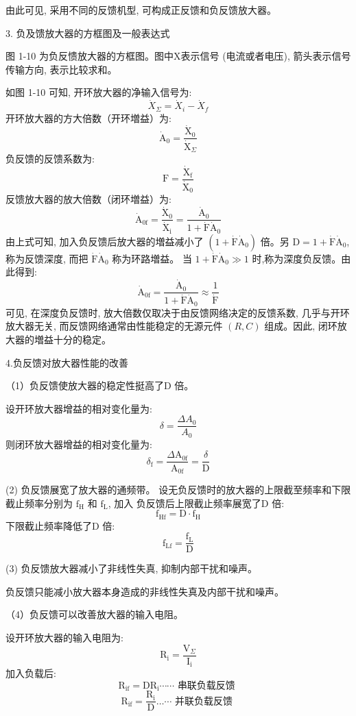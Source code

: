 \documentclass[lang=cn,11pt]{elegantpaper}
\begin{document}
由此可见, 采用不同的反馈机型, 可构成正反馈和负反馈放大器。

3. 负及馈放大器的方框图及一般表达式


图 1-10 为负反愦放大器的方框图。图中X表示信号 (电流或者电压), 箭头表示信号传输方向, 表示比较求和。


如图 1-10 可知, 开环放大器的净输入信号为:
$$
\dot{X}_{\Sigma}=\dot{X}_{i}-\dot{X}_{f}
$$
开环放大器的方大倍数（开环増益）为:
$$
\dot{\mathrm{A}}_{0}=\frac{\dot{\mathrm{X}}_{0}}{\dot{\mathrm{X}}_{\Sigma}}
$$
负反馈的反馈系数为:
$$
\mathrm{F}=\frac{\dot{\mathrm{X}}_{\mathrm{f}}}{\dot{\mathrm{X}}_{0}}
$$
反馈放大器的放大倍数（闭环増益）为:
$$
\dot{\mathrm{A}}_{0 \mathrm{f}}=\frac{\dot{\mathrm{X}}_{0}}{\dot{\mathrm{X}}_{\mathrm{i}}}=\frac{\dot{\mathrm{A}}_{0}}{1+\dot{\mathrm{F}} \dot{\mathrm{A}}_{0}}
$$
由上式可知, 加入负反馈后放大器的増益减小了 $\left(1+\dot{\mathrm{F}} \dot{\mathrm{A}}_{0}\right)$ 倍。另 $\mathrm{D}=1+\dot{\mathrm{F}} \dot{\mathrm{A}}_{0}$, 称为反馈深度, 而把 $\dot{\mathrm{F}} \dot{\mathrm{A}}_{0}$ 称为环路増益。 当 $1+\dot{\mathrm{F}} \dot{\mathrm{A}}_{0} \gg 1$ 时,称为深度负反馈。由 此得到:
$$
\dot{\mathrm{A}}_{0 \mathrm{f}}=\frac{\dot{\mathrm{A}}_{0}}{1+\dot{\mathrm{F}} \dot{\mathrm{A}}_{0}} \approx \frac{1}{\dot{\mathrm{F}}}
$$
可见, 在深度负反馈时, 放大倍数仅取决于由反馈网络决定的反馈系数, 几乎与开环放大器无关, 而反馈网络通常由性能稳定的无源元件 $(R, C)$ 组成。因此, 闭环放大器的増益十分的稳定。

4.负反馈对放大器性能的改善

（1）负反馈使放大器的稳定性挺高了D 倍。 

设开环放大器增益的相对变化量为:
$$
\delta=\frac{\Delta A_{0}}{A_{0}}
$$
则闭环放大器增益的相对变化量为:
$$
\delta_{\mathrm{f}}=\frac{\Delta \mathrm{A}_{0 \mathrm{f}}}{\mathrm{A}_{0 \mathrm{f}}}=\frac{\delta}{\mathrm{D}}
$$


(2) 负反馈展宽了放大器的通频带。
设无负反馈时的放大器的上限截至频率和下限截止频率分别为 $\mathrm{f}_{\mathrm{H}}$ 和 $\mathrm{f}_{\mathrm{L}}$, 加入 负反馈后上限截止频率展宽了D 倍:
$$
\mathrm{f}_{\mathrm{Hf}}=\mathrm{D} \cdot \mathrm{f}_{\mathrm{H}}
$$
下限截止频率降低了D 倍:
$$
\mathrm{f}_{\mathrm{Lf}}=\frac{\mathrm{f}_{\mathrm{L}}}{\mathrm{D}}
$$


(3) 负反馈放大器减小了非线性失真, 抑制内部干扰和噪声。 

负反馈只能减小放大器本身造成的非线性失真及内部干扰和噪声。


（4）负反馈可以改善放大器的输入电阻。

设开环放大器的输入电阻为:
$$
\mathrm{R}_{\mathrm{i}}=\frac{\mathrm{V}_{\Sigma}}{\mathrm{I}_{\mathrm{i}}}
$$
加入负载后:
$$
\mathrm{R}_{\mathrm{if}}=\mathrm{DR}_{\mathrm{i}} \cdots \cdots \text { 串联负载反馈 }
$$
$$
\mathrm{R}_{\mathrm{if}}=\frac{\mathrm{R}_{\mathrm{i}}}{\mathrm{D}} \ldots \cdots \text { 并联负载反馈 }
$$
\end{document}
